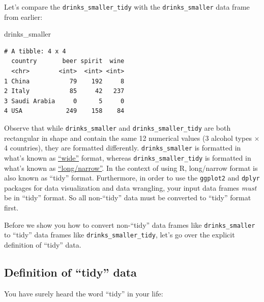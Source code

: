 \documentclass[
  letterpaper,
  DIV=11,
  numbers=noendperiod]{scrreprt}
\newenvironment{Shaded}{\begin{snugshade}}{\end{snugshade}}
\newcommand{\NormalTok}[1]{\textcolor[rgb]{0.00,0.23,0.31}{#1}}
\theoremstyle{definition}
\theoremstyle{remark}
\begin{document}
Let's compare the \texttt{drinks\_smaller\_tidy} with the
\texttt{drinks\_smaller} data frame from earlier:

\begin{Shaded}
\begin{Highlighting}[]
\NormalTok{drinks\_smaller}
\end{Highlighting}
\end{Shaded}

\begin{verbatim}
# A tibble: 4 x 4
  country       beer spirit  wine
  <chr>        <int>  <int> <int>
1 China           79    192     8
2 Italy           85     42   237
3 Saudi Arabia     0      5     0
4 USA            249    158    84
\end{verbatim}

Observe that while \texttt{drinks\_smaller} and
\texttt{drinks\_smaller\_tidy} are both rectangular in shape and contain
the same 12 numerical values (3 alcohol types \(\times\) 4 countries),
they are formatted differently. \texttt{drinks\_smaller} is formatted in
what's known as
\href{https://en.wikipedia.org/wiki/Wide_and_narrow_data}{``wide''}
format, whereas \texttt{drinks\_smaller\_tidy} is formatted in what's
known as
\href{https://en.wikipedia.org/wiki/Wide_and_narrow_data\#Narrow}{``long/narrow''}.
In the context of using R, long/narrow format is also known as ``tidy''
format. Furthermore, in order to use the \texttt{ggplot2} and
\texttt{dplyr} packages for data visualization and data wrangling, your
input data frames \emph{must} be in ``tidy'' format. So all non-``tidy''
data must be converted to ``tidy'' format first.

Before we show you how to convert non-``tidy'' data frames like
\texttt{drinks\_smaller} to ``tidy'' data frames like
\texttt{drinks\_smaller\_tidy}, let's go over the explicit definition of
``tidy'' data.

\hypertarget{definition-of-tidy-data}{%
\subsection{Definition of ``tidy'' data}\label{definition-of-tidy-data}}

You have surely heard the word ``tidy'' in your life:
\end{document}
